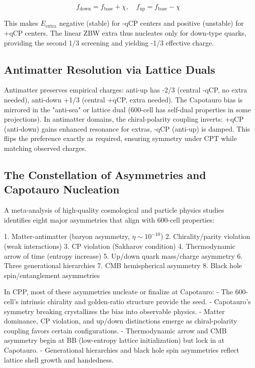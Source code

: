 \documentclass{article}
\begin{document}
\begin{equation}
f_{\text{down}} = f_{\text{base}} + \chi, \quad f_{\text{up}} = f_{\text{base}} - \chi
\end{equation}

This makes $E_{\text{extra}}$ negative (stable) for -qCP centers and positive (unstable) for +qCP centers. The linear ZBW extra thus nucleates only for down-type quarks, providing the second 1/3 screening and yielding -1/3 effective charge.

\subsection{Antimatter Resolution via Lattice Duals}

Antimatter preserves empirical charges: anti-up has -2/3 (central -qCP, no extra needed), anti-down +1/3 (central +qCP, extra needed). The Capotauro bias is mirrored in the "anti-sea" or lattice dual (600-cell has self-dual properties in some projections). In antimatter domains, the chiral-polarity coupling inverts: +qCP (anti-down) gains enhanced resonance for extras, -qCP (anti-up) is damped. This flips the preference exactly as required, ensuring symmetry under CPT while matching observed charges.

\subsection{The Constellation of Asymmetries and Capotauro Nucleation}

A meta-analysis of high-quality cosmological and particle physics studies identifies eight major asymmetries that align with 600-cell properties:

1. Matter-antimatter (baryon asymmetry, $\eta \sim 10^{-10}$)
2. Chirality/parity violation (weak interactions)
3. CP violation (Sakharov condition)
4. Thermodynamic arrow of time (entropy increase)
5. Up/down quark mass/charge asymmetry
6. Three generational hierarchies
7. CMB hemispherical asymmetry
8. Black hole spin/entanglement asymmetries

In CPP, most of these asymmetries nucleate or finalize at Capotauro:
- The 600-cell's intrinsic chirality and golden-ratio structure provide the seed.
- Capotauro's symmetry breaking crystallizes the bias into observable physics.
- Matter dominance, CP violation, and up/down distinctions emerge as chiral-polarity coupling favors certain configurations.
- Thermodynamic arrow and CMB asymmetry begin at BB (low-entropy lattice initialization) but lock in at Capotauro.
- Generational hierarchies and black hole spin asymmetries reflect lattice shell growth and handedness.
\end{document}
